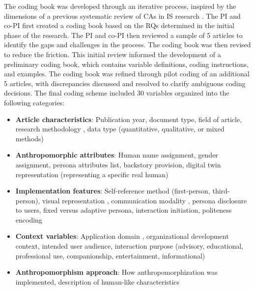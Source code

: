 \documentclass[manuscript,anonymous,sigconf]{acmart}
\begin{document}
The coding book was developed through an iterative process, inspired by the dimensions of a previous systematic review of CAs in IS research \citep{diederich_conversational_2019}. The PI and co-PI first created a coding book based on the RQs determined in the initial phase of the research. The PI and co-PI then reviewed a sample of 5 articles to identify the gaps and challenges in the process. The coding book was then revised to reduce the friction. This initial review informed the development of a preliminary coding book, which contains variable definitions, coding instructions, and examples. The coding book was refined through pilot coding of an additional 5 articles, with discrepancies discussed and resolved to clarify ambiguous coding decisions. The final coding scheme included 30 variables organized into the following categories:

\begin{itemize}
    \item \textbf{Article characteristics}: Publication year, document type, field of article, research methodology \citep[adapted from IS research method dimension in][]{diederich_conversational_2019}, data type (quantitative, qualitative, or mixed methods)
    \item \textbf{Anthropomorphic attributes}: Human name assignment, gender assignment, persona attributes list, backstory provision, digital twin representation (representing a specific real human)
    \item \textbf{Implementation features}: Self-reference method (first-person, third-person), visual representation \citep[extending CA embodiment dimension in][]{diederich_conversational_2019}, communication modality \citep[extending CA communication mode in][]{diederich_conversational_2019}, persona disclosure to users, fixed versus adaptive persona, interaction initiation, politeness encoding
    \item \textbf{Context variables}: Application domain \citep[adapted from CA context in][]{diederich_conversational_2019}, organizational development context, intended user audience, interaction purpose (advisory, educational, professional use, companionship, entertainment, informational)
    \item \textbf{Anthropomorphism approach}: How anthropomorphization was implemented, description of human-like characteristics
\end{itemize}
\end{document}
